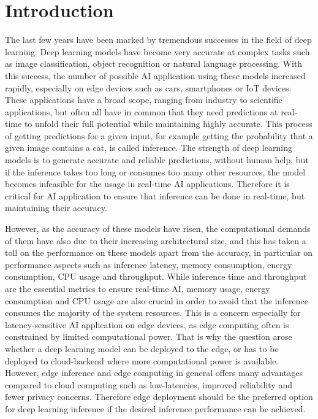 \chapter{Introduction}


The last few years have been marked by tremendous successes in the field of deep learning.
Deep learning models have become very accurate at complex tasks such as image classification, object recognition or natural language processing. 
With this success, the number of possible AI application using these models increased rapidly, especially on edge devices such as cars, smartphones or IoT devices.
These applications have a broad scope, ranging from industry to scientific applications, but often all have in common that they need predictions at real-time to unfold their full potential while maintaining highly accurate.
This process of getting predictions for a given input, for example getting the probability that a given image contains a cat, is called inference.
The strength of deep learning models is to generate accurate and reliable predictions, without human help, but if the inference takes too long or consumes too many other resources, the model becomes infeasible for the usage in real-time AI applications.
Therefore it is critical for AI application to ensure that inference can be done in real-time, but maintaining their accuracy.

However, as the accuracy of these models have risen, the computational demands of them have also due to their increasing architectural size, and this has taken a toll on the performance on these models apart from the accuracy, in particular on performance aspects such as inference latency, memory consumption, energy consumption, CPU usage and throughput. 
While inference time and throughput are the essential metrics to ensure real-time AI, memory usage, energy consumption and CPU usage are also crucial in order to avoid that the inference consumes the majority of the system resources.
This is a concern especially for latency-sensitive AI application on edge devices, as edge computing often is constrained by limited computational power. 
That is why the question arose whether a deep learning model can be deployed to the edge, or has to be deployed to cloud-backend where more computational power is available.
However, edge inference and edge computing in general offers many advantages compared to cloud computing such as low-latencies, improved reliability and fewer privacy concerns\cite{Mor:2018:EC:3305263.3313377}.
Therefore edge deployment should be the preferred option for deep learning inference if the desired inference performance can be achieved.


